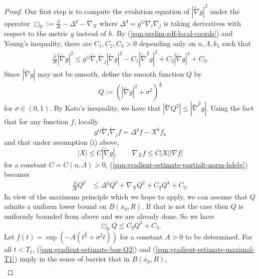 \documentclass[12pt]{amsart}
\theoremstyle{plain}
\theoremstyle{plain}
\theoremstyle{definition}
\theoremstyle{remark}
\numberwithin{equation}{subsection}
\newcommand{\del}{\nabla}
\newcommand{\hdel}{\tilde{\nabla}}
\begin{document}
\begin{proof}
    Our first step is to compute the evolution equation of $|\hdel g|^2$ under the operator $\Box_g := \frac{\partial}{\partial t} - \Delta^{g} - \nabla_X$ where $\Delta^g = g^{ij}\del_i\del_j$ is taking derivatives with respect to the metric $g$ instead of $h$. By (\ref{eqn:prelim-rdf-local-coords}) and Young's inequality, there are $C_1, C_2, C_3 > 0$ depending only on $n, \Lambda, k_1$ such that
    \begin{align}\label{eqn:gradient-estimate-partialt-norm-hdelg}
        \frac{\partial}{\partial t} |\hdel g|^2 \leq g^{ij}\hdel_i\hdel_j|\hdel g|^2 - C_1|\hdel^2 g|^2 + C_2 |\hdel g|^4 + C_3.
    \end{align}
    Since $|\hdel g|$ may not be smooth, define the smooth function $Q$ by
    \begin{equation*}
        Q := \left(|\hdel g|^2 + \sigma^2\right)^{\frac{1}{2}}
    \end{equation*}
    for $\sigma \in (0, 1)$. By Kato's inequality, we have that $|\hdel Q^2|\leq |\hdel^2 g|$. Using the fact that for any function $f$, locally
    \begin{equation*}
        g^{ij}\hdel_i\hdel_j f = \Delta^g f - X^kf_k
    \end{equation*}
    and that under assumption (i) above,
    \begin{equation*}
        |X|\leq C|\hdel g|,\qquad \del_X f \leq C|X||\del f|
    \end{equation*}
    for a constant $C = C(n,\Lambda) > 0$, (\ref{eqn:gradient-estimate-partialt-norm-hdelg}) becomes
    \begin{align}\label{eqn:gradient-estimate-partialt-Qsquared}
        \frac{\partial}{\partial t} Q^2 &\leq \Delta^g Q^2 + \del_X Q^2 + C_2Q^4 + C_3.
    \end{align}
    In view of the maximum principle which we hope to apply, we can assume that $Q$ admits a uniform lower bound on $B(x_0, R)$. If that is not the case then $Q$ is uniformly bounded from above and we are already done. So we have
    \begin{equation}\label{eqn:gradient-estimate-box-Q2}
        \Box_g Q \leq C_2 Q^3 + C_3.
    \end{equation}
    Let $f(t) = \exp\left(-A(t^{\frac{\delta}{p}} + \sigma^2 t)\right)$ for a constant $A > 0$ to be determined. For all $t < T_1$, (\ref{eqn:gradient-estimate-box-Q2}) and (\ref{eqn:gradient-estimate-maximal-T1}) imply in the sense of barrier that in $B(x_0, R)$,
    \begin{align}\label{eqn:gradient-estimate-box-Q3}

\end{align}
\end{proof}
\end{document}
